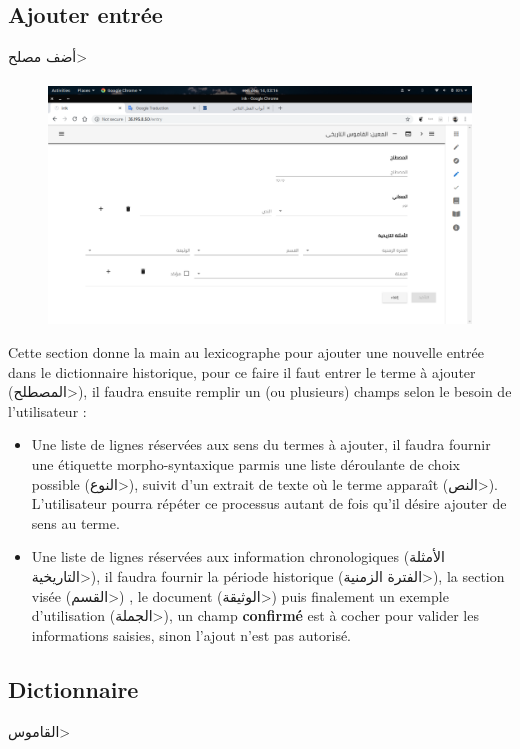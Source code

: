 \documentclass[]{report}
\begin{document}
		\subsection{Ajouter entrée}
		\Large{\<أضف مصلح>}
			\paragraph{}
			\begin{figure}[H]
				\centering
				\includegraphics[width=0.8\linewidth]{images/app/addentry.png}
			\end{figure}
			Cette section donne la main au lexicographe pour ajouter une nouvelle entrée dans le dictionnaire historique, pour ce faire il faut entrer le terme à ajouter (\<المصطلح>), il faudra ensuite remplir un (ou plusieurs) champs selon le besoin
			de l'utilisateur : 
			\begin{itemize}
				\item Une liste de lignes réservées aux sens du termes à ajouter, il faudra fournir une étiquette morpho-syntaxique parmis une liste déroulante de choix possible (\<النوع>), suivit d'un extrait de texte où le terme apparaît (\<النص>).
				L'utilisateur pourra répéter ce processus autant de fois qu'il désire ajouter de sens au terme.
				
				\item Une liste de lignes réservées aux information chronologiques (\<الأمثلة التاريخية>), il faudra fournir la période historique (\<الفترة الزمنية>), la section visée (\<القسم>) , le document (\<الوثيقة>) puis finalement
				un exemple d'utilisation (\<الجملة>), un champ \textbf{confirmé} est à cocher pour valider les informations saisies, sinon l'ajout n'est pas autorisé.
			\end{itemize}
		\subsection{Dictionnaire}
		\Large{\<القاموس>}
\end{document}
